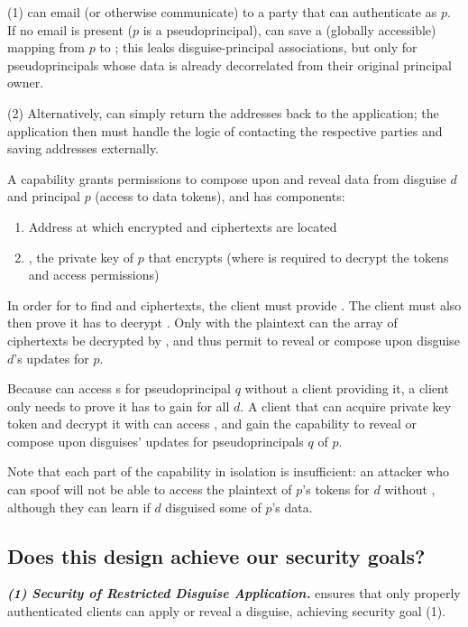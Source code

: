 (1) \sys can email (or otherwise communicate)
 to a party that can authenticate as $p$. If no email is present (\eg $p$ is a pseudoprincipal),
\sys can save a (globally accessible) mapping from $p$ to ; this leaks disguise-principal associations, but
only for pseudoprincipals whose data is already decorrelated from their original principal owner.

(2) Alternatively, \sys can simply return the addresses back to the application; the application
then must handle the logic of contacting the respective parties and saving addresses externally.

A capability  grants permissions to compose upon and reveal data from disguise $d$ and
principal $p$ (\ie access to data tokens), and has components:
\begin{enumerate}
\item Address  at which encrypted  and  ciphertexts are located
\item {}, the private key of $p$ that encrypts  (where  is required to
    decrypt the  tokens and access permissions)
\end{enumerate}

In order for \sys to find  and  ciphertexts, the client must provide . 
The client must also then prove it has  to decrypt . Only with the
plaintext  can the array of  ciphertexts be decrypted by \sys, and thus permit
\sys to reveal or compose upon disguise $d$'s updates for $p$.

Because \sys can access s for pseudoprincipal $q$ without a client providing it, a client
only needs to prove it has  to gain  for all $d$.  A client that can acquire
private key token  and decrypt it with  can access , and gain the
capability to reveal or compose upon disguises' updates for pseudoprincipals $q$ of $p$. 

Note that each part of the capability in isolation is insufficient: an attacker who can spoof  will not be able to access the plaintext of $p$'s tokens for $d$ without , although they can learn if $d$ disguised some of $p$'s data.

\subsection{Does this design achieve our security goals?}
\label{sec:achievegoals}
\vspace{6pt}\noindent\textbf{\emph{(1) Security of Restricted Disguise Application.}}
\sys ensures that only properly authenticated clients can apply or
reveal a disguise, achieving security goal (1).

